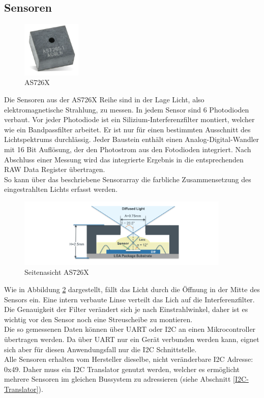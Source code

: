 \subsection{Sensoren}\label{Sensoren}

\begin{figure}
\centering
\includegraphics[width=0.25\textwidth]{img/as726X.png}
 \caption{AS726X \cite{Datenblatt_AS7265X}}
\label{fig:AS726X}
\end{figure}

Die Sensoren aus der AS726X Reihe sind in der Lage Licht, also elektromagnetische Strahlung, zu messen. 
In jedem Sensor sind 6 Photodioden verbaut. 
Vor jeder Photodiode ist ein Silizium-Interferenzfilter montiert, welcher wie ein Bandpassfilter arbeitet. Er ist nur für einen bestimmten Ausschnitt des Lichtspektrums durchlässig.
Jeder Baustein enthält einen Analog-Digital-Wandler mit 16 Bit Auflösung, der den Photostrom aus den Fotodioden integriert. Nach Abschluss einer Messung wird das integrierte Ergebnis in die entsprechenden RAW Data Register übertragen.\\
So kann über das beschriebene Sensorarray die farbliche Zusammensetzung des eingestrahlten Lichts erfasst werden.

\begin{figure}[H]
\centering
\includegraphics[width=0.9\textwidth]{img/AS726X-seitenansicht.png}
\caption{Seitenasicht AS726X\cite{Datenblatt_AS7265X}}
\label{fig:Seitenasicht-AS726X}
\end{figure}

\noindent Wie in Abbildung \ref{fig:Seitenasicht-AS726X} dargestellt, fällt das Licht durch die Öffnung in der Mitte des Sensors ein. Eine intern verbaute Linse verteilt das Lich auf die Interferenzfilter. Die Genauigkeit der Filter verändert sich je nach Einstrahlwinkel, daher ist es wichtig vor den Sensor noch eine Streuscheibe zu montieren.\\
Die so gemessenen Daten können über UART oder I2C an einen Mikrocontroller übertragen werden. Da über UART nur ein Gerät verbunden werden kann, eignet sich aber für diesen Anwendungsfall nur die I2C Schnittstelle.\\
\newpage
\noindent Alle Sensoren erhalten vom Hersteller dieselbe, nicht veränderbare I2C Adresse: 0x49. Daher muss ein I2C Translator genutzt werden, welcher es ermöglicht mehrere Sensoren im gleichen Bussystem zu adressieren (siehe Abschnitt \ref{I2C-Translator}).\\


